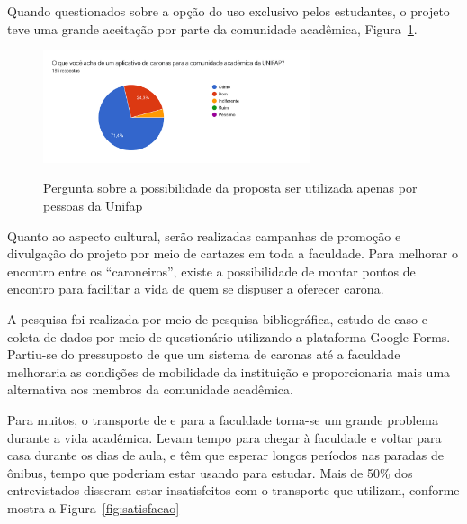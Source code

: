 Quando questionados sobre a opção do uso exclusivo pelos estudantes, o projeto teve uma grande aceitação por parte da comunidade acadêmica, Figura~\ref{fig:aceitacao}. 

\begin{figure}[!hbtp]
	\centering
	\caption{Pergunta sobre a possibilidade da proposta ser utilizada apenas por pessoas da Unifap}
	\includegraphics[width=0.7\textwidth]{./04-figuras/questionario/5.png}
	\label{fig:aceitacao}
\end{figure}

Quanto ao aspecto cultural, serão realizadas campanhas de promoção e divulgação do projeto por meio de cartazes em toda a faculdade. Para melhorar o encontro entre os “caroneiros”, existe a possibilidade de montar pontos de encontro para facilitar a vida de quem se dispuser a oferecer carona.

A pesquisa foi realizada por meio de pesquisa bibliográfica, estudo de caso e coleta de dados por meio de questionário utilizando a plataforma Google Forms. Partiu-se do pressuposto de que um sistema de caronas até a faculdade melhoraria as condições de mobilidade da instituição e proporcionaria mais uma alternativa aos membros da comunidade acadêmica.

Para muitos, o transporte de e para a faculdade torna-se um grande problema durante a vida acadêmica. Levam tempo para chegar à faculdade e voltar para casa durante os dias de aula, e têm que esperar longos períodos nas paradas de ônibus, tempo que poderiam estar usando para estudar. Mais de 50\% dos entrevistados disseram estar insatisfeitos com o transporte que utilizam, conforme mostra a Figura~\ref{fig:satisfacao}

